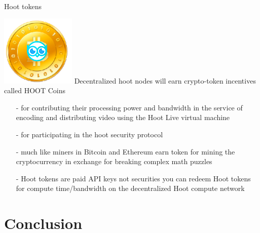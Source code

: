 \documentclass[10pt]{beamer}
\begin{document}
\begin{frame}[t]{ Hoot tokens }
    
    
\includegraphics[scale=0.4]{static/hootcoin}     Decentralized hoot nodes will earn crypto-token incentives called HOOT Coins 
    

    \begin{itemize}
    \item[-]for contributing their processing power and bandwidth in the service of encoding and distributing video using the Hoot Live virtual machine 
    \item[-]for participating in the hoot security protocol
    \item[-]much like miners in Bitcoin and Ethereum earn token for mining the cryptocurrency in exchange for breaking complex math puzzles
    \item[-]Hoot tokens are paid API keys not securities you can redeem Hoot tokens for compute time/bandwidth on the decentralized Hoot compute network
    \end{itemize}
    
    
    
\end{frame}

\section{Conclusion}
\end{document}
